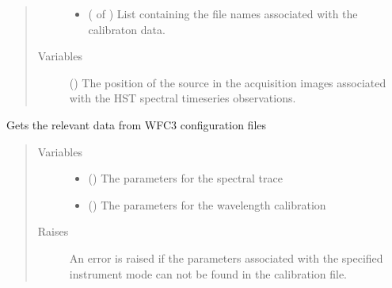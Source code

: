 \documentclass[a4paper,10pt,english]{sphinxmanual}
\begin{document}
\begin{fulllineitems}
\begin{fulllineitems}
\begin{quote}
\begin{description}
\begin{itemize}
\item {} 
 ( of ) \textendash{} List containing the file names associated with the calibraton data.

\end{itemize}

\item[{Variables}] \leavevmode
{} () \textendash{} The position of the source in the acquisition images associated
with the HST spectral timeseries observations.

\end{description}\end{quote}

\end{fulllineitems}


\begin{fulllineitems}
\label{\detokenize{cascade.instruments:cascade.instruments.instruments.HSTWFC3._read_grism_configuration_files}}
Gets the relevant data from WFC3 configuration files
\begin{quote}\begin{description}
\item[{Variables}] \leavevmode\begin{itemize}
\item {} 
 () \textendash{} The parameters for the spectral trace

\item {} 
 () \textendash{} The parameters for the wavelength calibration

\end{itemize}

\item[{Raises}] \leavevmode
{} \textendash{} An error is raised if the parameters associated
with the specified instrument mode can not be found in the
calibration file.


\end{description}
\end{quote}
\end{fulllineitems}
\end{fulllineitems}
\end{document}
